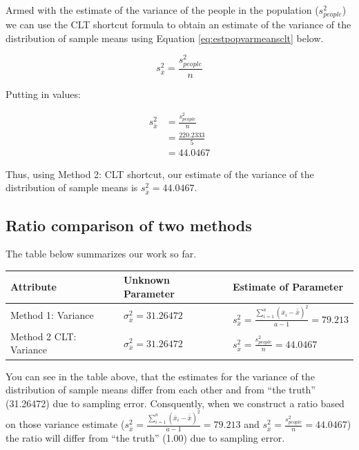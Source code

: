 \documentclass[
]{krantz}
\begin{document}
Armed with the estimate of the variance of the people in the population (\(s_{people}^2\)) we can use the CLT shortcut formula to obtain an estimate of the variance of the distribution of sample means using Equation \eqref{eq:estpopvarmeansclt} below.

\begin{equation} 
s_{\bar{x}}^2 = \frac{s_{people}^2}{n}
      \label{eq:estpopvarmeansclt}
\end{equation}

Putting in values:

\[
\begin{aligned} 
s_{\bar{x}}^2 &= \frac{s_{people}^2}{n}\\
&= \frac{220.2333 }{5}\\
&= 44.0467
\end{aligned} 
\]

Thus, using Method 2: CLT shortcut, our estimate of the variance of the distribution of sample means is \(s_{\bar{x}}^2 = 44.0467\).

\hypertarget{ratio-comparison-of-two-methods-1}{%
\subsection{Ratio comparison of two methods}\label{ratio-comparison-of-two-methods-1}}

The table below summarizes our work so far.

\begin{longtable}[]{@{}
  >{\centering\arraybackslash}p{}
  >{\centering\arraybackslash}p{}
  >{\centering\arraybackslash}p{}@{}}
\toprule
Attribute & Unknown Parameter & Estimate of Parameter \\
\midrule
\endhead
Method 1: Variance & \(\sigma_{\bar{x}}^2 =31.26472\) & \(s_{\bar{x}}^2 = \frac{\sum_{i=1}^{a}{(\bar{x}_i - \bar{\bar{x}})^2}}{a-1}= 79.213\) \\
Method 2 CLT: Variance & \(\sigma_{\bar{x}}^2 =31.26472\) & \(s_{\bar{x}}^2 = \frac{s_{people}^2}{n}=44.0467\) \\
\bottomrule
\end{longtable}

You can see in the table above, that the estimates for the variance of the distribution of sample means differ from each other and from ``the truth'' (31.26472) due to sampling error. Consquently, when we construct a ratio based on those variance estimate (\(s_{\bar{x}}^2 = \frac{\sum_{i=1}^{a}{(\bar{x}_i - \bar{\bar{x}})^2}}{a-1}= 79.213\) and \(s_{\bar{x}}^2 = \frac{s_{people}^2}{n}=44.0467\)) the ratio will differ from ``the truth'' (1.00) due to sampling error.
\end{document}
